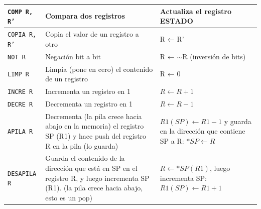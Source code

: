 \documentclass{article}
\begin{document}
\begin{longtable}{|p{}|p{}|p{}|}
  \hline
  \texttt{COMP R, R'}         & Compara dos registros                                                                                                                        & Actualiza el registro ESTADO                                                                  \\
  \hline
  \texttt{COPIA R, R'}        & Copia el valor de un registro a otro                                                                                                         & R ← R'                                                                                        \\
  \hline
  \texttt{NOT R}              & Negación bit a bit                                                                                                                           & R ← $\sim$R (inversión de bits)                                                               \\
  \hline
  \texttt{LIMP R}             & Limpia (pone en cero) el contenido de un registro                                                                                            & R ← 0                                                                                         \\
  \hline
  \texttt{INCRE R}            & Incrementa un registro en 1                                                                                                                  & $R \leftarrow R + 1$                                                                          \\
  \hline
  \texttt{DECRE R}            & Decrementa un registro en 1                                                                                                                  & $R \leftarrow R - 1$                                                                          \\
  \hline
  \texttt{APILA R}            & Decrementa (la pila crece hacia abajo en la memoria) el registro SP (R1) y hace push del registro R en la pila (lo guarda)                   & $R1 (SP) \leftarrow R1 - 1$ y guarda en la dirección que contiene SP a R:  $*SP \leftarrow R$ \\
  \hline
  \texttt{DESAPILA R}         & Guarda el contenido de la dirección que está en SP en el registro R, y luego incrementa SP (R1). (la pila crece hacia abajo, esto es un pop) & $R \leftarrow *SP(R1)$, luego incrementa SP: $R1(SP) \leftarrow  R1 + 1 $                     \\
  \hline
\end{longtable}
\end{document}
